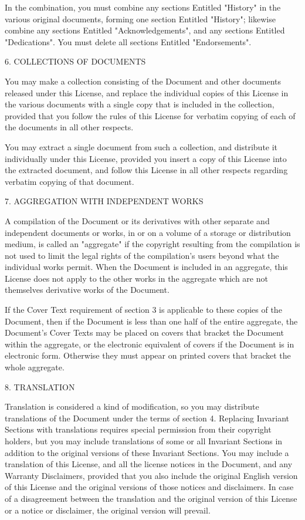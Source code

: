 \documentclass[11pt]{article}
\begin{document}
In the combination, you must combine any sections Entitled "History"
in the various original documents, forming one section Entitled
"History"; likewise combine any sections Entitled "Acknowledgements",
and any sections Entitled "Dedications".  You must delete all sections
Entitled "Endorsements".


6. COLLECTIONS OF DOCUMENTS

You may make a collection consisting of the Document and other
documents released under this License, and replace the individual
copies of this License in the various documents with a single copy
that is included in the collection, provided that you follow the rules
of this License for verbatim copying of each of the documents in all
other respects.

You may extract a single document from such a collection, and
distribute it individually under this License, provided you insert a
copy of this License into the extracted document, and follow this
License in all other respects regarding verbatim copying of that
document.


7. AGGREGATION WITH INDEPENDENT WORKS

A compilation of the Document or its derivatives with other separate
and independent documents or works, in or on a volume of a storage or
distribution medium, is called an "aggregate" if the copyright
resulting from the compilation is not used to limit the legal rights
of the compilation's users beyond what the individual works permit.
When the Document is included in an aggregate, this License does not
apply to the other works in the aggregate which are not themselves
derivative works of the Document.

If the Cover Text requirement of section 3 is applicable to these
copies of the Document, then if the Document is less than one half of
the entire aggregate, the Document's Cover Texts may be placed on
covers that bracket the Document within the aggregate, or the
electronic equivalent of covers if the Document is in electronic form.
Otherwise they must appear on printed covers that bracket the whole
aggregate.


8. TRANSLATION

Translation is considered a kind of modification, so you may
distribute translations of the Document under the terms of section 4.
Replacing Invariant Sections with translations requires special
permission from their copyright holders, but you may include
translations of some or all Invariant Sections in addition to the
original versions of these Invariant Sections.  You may include a
translation of this License, and all the license notices in the
Document, and any Warranty Disclaimers, provided that you also include
the original English version of this License and the original versions
of those notices and disclaimers.  In case of a disagreement between
the translation and the original version of this License or a notice
or disclaimer, the original version will prevail.
\end{document}
